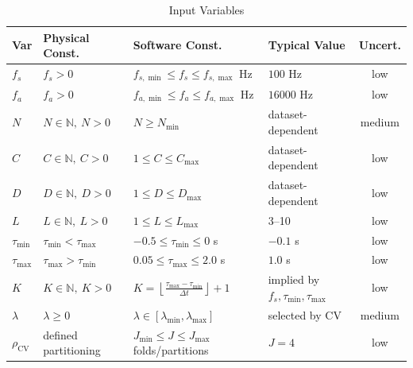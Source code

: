 \documentclass[12pt]{article}
\begin{document}
\renewcommand{\arraystretch}{1.2}
\begin{longtable}{l l l l c}
\caption{Input Variables}\label{TblInputVar}\\
  \toprule
  \textbf{Var} & \textbf{Physical Const.} & \textbf{Software Const.} &
  \textbf{Typical Value} & \textbf{Uncert.}\\
  \midrule
  $f_s$ & $f_s>0$ & 
  $f_{s,\min} \le f_s \le f_{s,\max}$ \si{\hertz} & 
  $100$ \si{\hertz} &
  low\\

  $f_a$ & $f_a>0$ & 
  $f_{a,\min} \le f_a \le f_{a,\max}$ \si{\hertz} & 
  $16000$ \si{\hertz} &
  low\\

  $N$ & $N \in \mathbb{N},\ N>0$ &
  $N \ge N_{\min}$ &
  dataset-dependent &
  medium\\

  $C$ & $C \in \mathbb{N},\ C>0$ &
  $1 \le C \le C_{\max}$ &
  dataset-dependent &
  low\\

  $D$ & $D \in \mathbb{N},\ D>0$ &
  $1 \le D \le D_{\max}$ &
  dataset-dependent &
  low\\

  $L$ & $L \in \mathbb{N},\ L>0$ &
  $1 \le L \le L_{\max}$ &
  3--10 &
  low\\

  $\tau_{\min}$ & $\tau_{\min}<\tau_{\max}$ &
  $-0.5 \le \tau_{\min} \le 0$ \si{\second} &
  $-0.1$ \si{\second} &
  low\\

  $\tau_{\max}$ & $\tau_{\max}>\tau_{\min}$ &
  $0.05 \le \tau_{\max} \le 2.0$ \si{\second} &
  $1.0$ \si{\second} &
  low\\

  $K$ & $K \in \mathbb{N},\ K>0$ &
  $K = \left\lfloor\frac{\tau_{\max}-\tau_{\min}}{\Delta t}\right\rfloor + 1$ &
  implied by $f_s,\tau_{\min},\tau_{\max}$ &
  low\\

  $\lambda$ & $\lambda \ge 0$ &
  $\lambda \in [\lambda_{\min},\lambda_{\max}]$ &
  selected by CV &
  medium\\

  $\rho_{\mathrm{CV}}$ & defined partitioning & 
  $J_{\min} \le J \le J_{\max}$ folds/partitions & 
  $J=4$ &
  low\\

  \bottomrule
\end{longtable}
\end{document}
